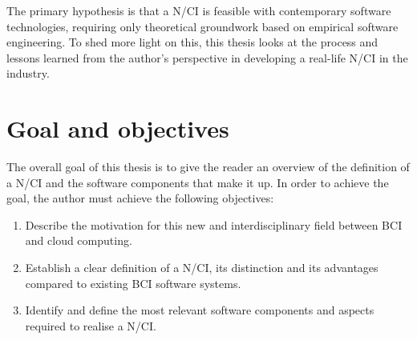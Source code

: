 The primary hypothesis is that a N/CI is feasible with contemporary software technologies, requiring only theoretical groundwork based on empirical software engineering. To shed more light on this, this thesis looks at the process and lessons learned from the author's perspective in developing a real-life N/CI in the industry.

\section{Goal and objectives}
\label{chapter1-goal-and-objectives}

The overall goal of this thesis is to give the reader an overview of the definition of a N/CI and the software components that make it up. In order to achieve the goal, the author must achieve the following objectives:

\begin{enumerate}
  \item Describe the motivation for this new and interdisciplinary field between BCI and cloud computing.
  \item Establish a clear definition of a N/CI, its distinction and its advantages compared to existing BCI software systems.
  \item Identify and define the most relevant software components and aspects required to realise a N/CI.
\end{enumerate}

